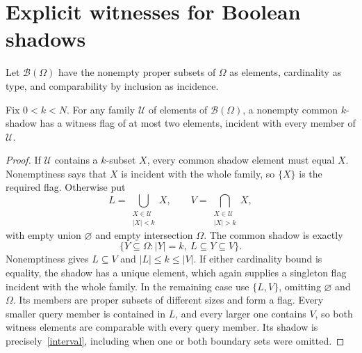 \section{Explicit witnesses for Boolean shadows}
Let $\mathcal B(\Omega)$ have the nonempty proper subsets of $\Omega$ as
elements, cardinality as type, and comparability by inclusion as incidence.

\begin{lemma}\label{boolean}
Fix $0<k<N$. For any family $\mathcal U$ of elements of
$\mathcal B(\Omega)$, a nonempty common $k$-shadow has a witness flag of
at most two elements, incident with every member of $\mathcal U$.
\end{lemma}
\begin{proof}
If $\mathcal U$ contains a $k$-subset $X$, every common shadow element
must equal $X$. Nonemptiness says that $X$ is incident with the whole
family, so $\{X\}$ is the required flag. Otherwise put
\[
 L=\bigcup_{\substack{X\in\mathcal U\\|X|<k}}X,
 \qquad V=\bigcap_{\substack{X\in\mathcal U\\|X|>k}}X,
\]
with empty union $\varnothing$ and empty intersection $\Omega$.
The common shadow is exactly
\begin{equation}\label{interval}
 \{Y\subseteq\Omega: |Y|=k,\ L\subseteq Y\subseteq V\}.
\end{equation}
Nonemptiness gives $L\subseteq V$ and $|L|\leq k\leq|V|$.
If either cardinality bound is equality, the shadow has a unique element,
which again supplies a singleton flag incident with the whole family.
In the remaining case use $\{L,V\}$, omitting $\varnothing$ and
$\Omega$. Its members are proper subsets of different sizes and form
a flag. Every smaller query member is contained in $L$, and every
larger one contains $V$, so both witness elements are comparable with
every query member. Its shadow is precisely~\eqref{interval}, including
when one or both boundary sets were omitted.
\end{proof}

